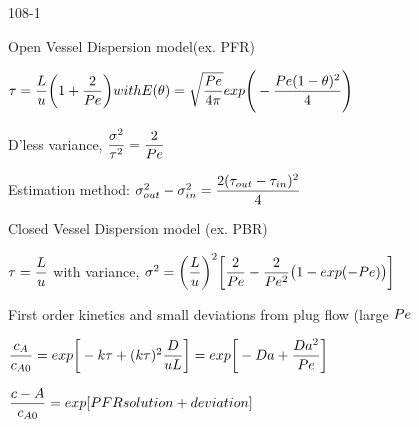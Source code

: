\begin{mitframe}{108-1}
 \begin {listone}
 \item Open Vessel Dispersion model(ex. PFR)   
 	\begin{listtwo}
		\item $\torque=\dfrac{\length}{\forcepot}\bigg(1+\dfrac{2}{\peclet}\bigg) with \energy(\theta)=\sqrt{\dfrac{\peclet}{4\pi}}exp\Bigg(-\dfrac{\peclet(1-\theta)^2}{4}\Bigg)$
        \item D'less variance, $\dfrac{\molecrad^2}{\torque^2}=\dfrac{2}{\peclet}$
        \item Estimation method: $\molecrad_{out}^2-\molecrad_{in}^2=\dfrac{2(\torque_{out}-\torque_{in})^2}{4}$
	\end{listtwo}
	\item Closed Vessel Dispersion model (ex. PBR)
    	\begin{listtwo}
        	\item $\torque=\dfrac{\length}{\forcepot}$ with     variance, $\molecrad^2=\bigg(\dfrac{\length}{\forcepot}\bigg)^2\bigg[\dfrac{2}{\peclet}-\dfrac{2}{\peclet^2}\big(1-exp(-\peclet)\big)\bigg]$
            \item First order kinetics and small deviations from plug flow (large $\peclet$
            	\begin{listthree}
                	\item $\dfrac{\lightspeed_{\helmholtz}}{\lightspeed_{\helmholtz\init}}=exp\bigg[-\thermcond\torque+(\thermcond\torque)^2\dfrac{\elecdisplace}{\forcepot\length}\bigg]=exp\bigg[-\damkohler+\dfrac{\damkohler^2}{\peclet}\bigg]$
                    \item $\dfrac{\lightspeed-{\helmholtz}}{\lightspeed_{\helmholtz\init}}=exp[PFR solution + deviation]$                    
                \end{listthree}
        \end{listtwo}
\end{listone}
\end{mitframe}